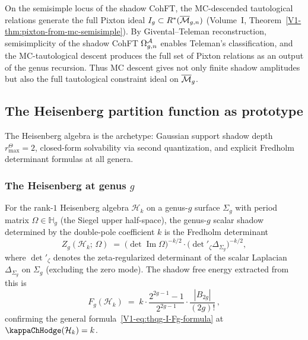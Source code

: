 \begin{remark}
\label{rem:vol2-pixton-from-mc}
On the semisimple locus of the shadow CohFT, the MC-descended
tautological relations generate the full Pixton ideal
$I_g \subset R^*(\overline{\mathcal{M}}_{g,n})$
\textup{(}Volume~I, Theorem~\textup{\ref*{V1-thm:pixton-from-mc-semisimple})}.
By Givental--Teleman reconstruction, semisimplicity
of the shadow CohFT $\Omega^{\mathcal{A}}_{g,n}$ enables Teleman's classification,
and the MC-tautological descent produces the full set of Pixton relations
as an output of the genus recursion. Thus MC descent gives not only
finite shadow amplitudes but also the full tautological constraint ideal on
$\overline{\mathcal{M}}_g$.
\end{remark}


\subsection{The Heisenberg partition function as prototype}
\label{subsec:thqg-I-heisenberg-prototype}

The Heisenberg algebra is the archetype: Gaussian support shadow depth
\(r^\Theta_{\max}=2\), closed-form solvability via second quantization,
and explicit Fredholm determinant formulas at all genera.

\subsubsection{The Heisenberg at genus $g$}

\begin{theorem}
\label{thm:heisenberg-sewing}
For the rank-$1$ Heisenberg algebra $\mathcal{H}_k$ on a genus-$g$ surface $\Sigma_g$ with period matrix $\Omega \in \mathbb{H}_g$ \textup{(}the Siegel upper half-space\textup{)}, the genus-$g$ scalar shadow determined by the double-pole coefficient $k$ is the Fredholm determinant
\begin{equation}%
\boxed{ Z_g(\mathcal{H}_k;\,\Omega) \;=\; \bigl(\det\operatorname{Im}\Omega\bigr)^{-k/2} \cdot \bigl(\det{}'_\zeta \Delta_{\Sigma_g}\bigr)^{-k/2}, }
\end{equation}
where $\det{}'_\zeta$ denotes the zeta-regularized determinant of the scalar Laplacian $\Delta_{\Sigma_g}$ on $\Sigma_g$ \textup{(}excluding the zero mode\textup{)}. The shadow free energy extracted from this is
\begin{equation}%
F_g(\mathcal{H}_k) \;=\; k \cdot \frac{2^{2g-1}-1}{2^{2g-1}} \cdot \frac{|B_{2g}|}{(2g)!}\,,
\end{equation}
confirming the general formula~\eqref{V1-eq:thqg-I-Fg-formula} at $\kappaChHodge(\mathcal{H}_k) = k$.
\end{theorem}


